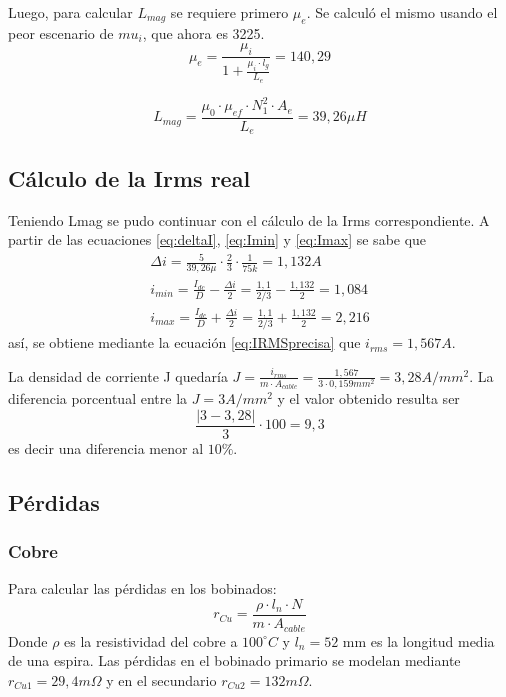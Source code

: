 \documentclass{article}
\begin{document}
Luego, para calcular $ L_{mag} $ se requiere primero $ \mu_e $. Se calculó el mismo usando el peor escenario de $ mu_i $, que ahora es 3225.
\begin{equation}
    \mu_{e} = \frac{\mu_i}{1 + \frac{\mu_i \cdot l_g}{L_e}} = 140,29
    \label{eq:MuEf}
\end{equation}

\begin{equation}
    L_{mag} = \frac{\mu_0 \cdot \mu_{ef} \cdot N_1^2 \cdot A_e}{L_e} = 39,26 \mu H
    \label{eq:Lmag}
\end{equation}


\subsection{Cálculo de la Irms real}

Teniendo Lmag se pudo continuar con el cálculo de la Irms correspondiente. A partir de las ecuaciones \ref{eq:deltaI}, \ref{eq:Imin} y \ref{eq:Imax} se sabe que 
\begin{align*}
    \Delta i = \frac{5}{39,26\mu} \cdot \frac{2}{3} \cdot \frac{1}{75k} = 1,132 A \\
    i_{min} = \frac{I_{dc}}{D} - \frac{\Delta i}{2} = \frac{1,1}{2/3} - \frac{1,132}{2} = 1,084 \\
    i_{max} = \frac{I_{dc}}{D} + \frac{\Delta i}{2} = \frac{1,1}{2/3} + \frac{1,132}{2} = 2,216
\end{align*}
así, se obtiene mediante la ecuación \ref{eq:IRMSprecisa} que $ i_{rms} = 1,567 A $.

La densidad de corriente J quedaría $ J = \frac{i_{rms}}{m \cdot A_{cable}} = \frac{1,567}{3 \cdot 0,159 mm^2} = 3,28 A/mm^2  $. La diferencia porcentual entre la $ J = 3 A/mm^2 $ y el valor obtenido resulta ser
\begin{equation*}
    \frac{|3-3,28|}{3}\cdot100 = 9,3%
\end{equation*}
es decir una diferencia menor al $ 10\%$.


\subsection{Pérdidas}

\subsubsection{Cobre}
Para calcular las pérdidas en los bobinados:
\begin{equation}
    r_{Cu} = \frac{\rho \cdot l_n \cdot N}{m \cdot A_{cable}}
    \label{eq:Rcu}
\end{equation}
Donde $\rho$ es la resistividad del cobre a $100^\circ C$ y $l_n = 52 $ mm es la longitud media de una espira.
Las pérdidas en el bobinado primario se modelan mediante $ r_{Cu1} = 29,4 m\Omega $ y en el secundario $ r_{Cu2} = 132 m\Omega $.
\end{document}

